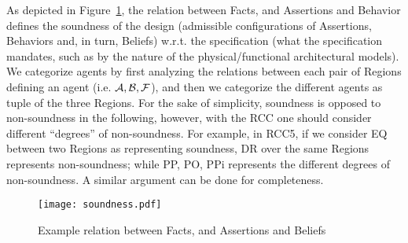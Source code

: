 As depicted in
Figure~\ref{fig:soundness}, the relation between Facts, and Assertions and Behavior
defines the soundness of the design (admissible configurations of Assertions,
Behaviors and, in turn, Beliefs) w.r.t. the specification (what the
specification mandates, such as by the nature of the physical/functional
architectural models). We categorize agents by first analyzing the relations
between each pair of Regions defining an agent (i.e. $\mathcal{A},\mathcal{B},\mathcal{F}$), and then we
categorize the different agents as tuple of the three Regions.
For the sake of simplicity, soundness is opposed to non-soundness in the following, however,
with the RCC one should consider different ``degrees'' of non-soundness. For example,
in RCC5, if we consider EQ between two Regions as representing soundness, DR over the same Regions
represents non-soundness; while PP, PO, PPi represents the different degrees of non-soundness.
A similar argument can be done for completeness.
\begin{figure}[t]
	\centering
	\texttt{[image: soundness.pdf]}
	\caption{Example relation between Facts, and Assertions and Beliefs}
	\label{fig:soundness}
\end{figure}

